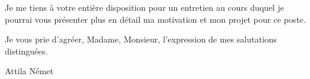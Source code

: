 \documentclass[a4paper,11pt]{article}
\begin{document}
\vspace{0.3cm}

\noindent Je me tiens à votre entière disposition pour un entretien au cours duquel je pourrai vous présenter plus en détail ma motivation et mon projet pour ce poste.

\vspace{0.5cm}

\noindent Je vous prie d'agréer, Madame, Monsieur, l'expression de mes salutations distinguées.

\vspace{1.5cm}

\noindent Attila Német
\end{document}
